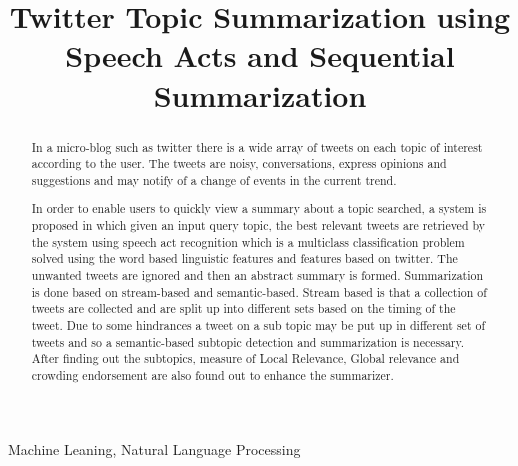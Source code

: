 \documentclass[conference]{IEEEtran}
\begin{document}
\title{Twitter Topic Summarization using Speech Acts and Sequential Summarization}
\author{
\and
{}
}

\maketitle
\begin{abstract}

\par In a micro-blog such as twitter there is a wide array of tweets on each topic of interest according to the user. The tweets are noisy, conversations, express opinions and suggestions and may notify of a change of events in the current trend.

\par In order to enable users to quickly view a summary about a topic searched, a system is proposed in which given an input query topic, the best relevant tweets are retrieved by the system using speech act recognition which is a multiclass classification problem solved using the word based linguistic features and features based on twitter. The unwanted tweets are ignored and then an abstract summary is formed. Summarization is done based on stream-based and semantic-based. Stream based is that a collection of tweets are collected and are split up into different sets based on the timing of the tweet. Due to some hindrances a tweet on a sub topic may be put up in different set of tweets and so a semantic-based subtopic detection and summarization is necessary. After finding out the subtopics, measure of Local Relevance, Global relevance and crowding endorsement are also found out to enhance the summarizer.

\end{abstract}

\maketitle
\begin{keywords}
Machine Leaning, Natural Language Processing
\end{keywords}
\end{document}
